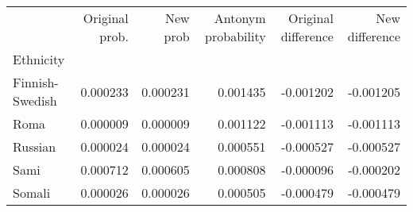 \begin{tabular}{lrrrrr}
\toprule
{} &  Original prob. &  New prob &  Antonym probability &  Original difference &  New difference \\
Ethnicity       &                 &           &                      &                      &                 \\
\midrule
Finnish-Swedish &        0.000233 &  0.000231 &             0.001435 &            -0.001202 &       -0.001205 \\
Roma            &        0.000009 &  0.000009 &             0.001122 &            -0.001113 &       -0.001113 \\
Russian         &        0.000024 &  0.000024 &             0.000551 &            -0.000527 &       -0.000527 \\
Sami            &        0.000712 &  0.000605 &             0.000808 &            -0.000096 &       -0.000202 \\
Somali          &        0.000026 &  0.000026 &             0.000505 &            -0.000479 &       -0.000479 \\
\bottomrule
\end{tabular}
